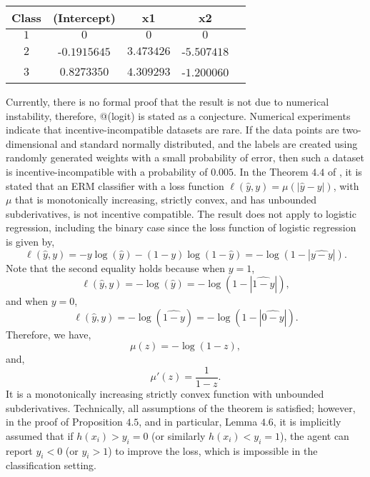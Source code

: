 \documentclass{article}
\begin{document}
\begin{center} \begin{tabular}{|c|c|c|c|c|}
\hline
 Class &(Intercept) &x1 &x2\\ \hline
$1$ &$0$ &$0$ &$0$\\ \hline
$2$ &-$0.1915645$ &$3.473426$ &-$5.507418$\\ \hline
$3$ &$0.8273350$ &$4.309293$ &-$1.200060$\\ \hline
\end{tabular} \end{center}
Currently, there is no formal proof that the result is not due to numerical instability, therefore, @(logit) is stated as a conjecture. Numerical experiments indicate that incentive-incompatible datasets are rare. If the data points are two-dimensional and standard normally distributed, and the labels are created using randomly generated weights with a small probability of error, then such a dataset is incentive-incompatible with a probability of $0.005$.
\newline \newline
In the Theorem $4.4$ of \citet*{dekel2010incentive}, it is stated that an ERM classifier with a loss function $\ell\left(\hat{y}, y\right) = \mu\left(\left| \hat{y} - y \right|\right)$, with $\mu$ that is monotonically increasing, strictly convex, and has unbounded subderivatives, is not incentive compatible. The result does not apply to logistic regression, including the binary case since the loss function of logistic regression is given by,
\begin{equation} 
\ell\left(\hat{y}, y\right) = - y \log\left(\hat{y}\right) - \left(1 - y\right) \log\left(1 - \hat{y}\right) = -\log\left(1-\left| \hat{y-y} \right|\right).
\end{equation}
Note that the second equality holds because when $y  = 1$,
\begin{equation} 
\ell\left(\hat{y}, y\right) = - \log\left(\hat{y}\right) = -\log\left(1-\left| \hat{1-y} \right|\right),
\end{equation}
and when $y  = 0$,
\begin{equation} 
\ell\left(\hat{y}, y\right) = - \log\left(\hat{1-y}\right) = -\log\left(1-\left| \hat{0-y} \right|\right).
\end{equation}
Therefore, we have,
\begin{equation} 
\mu\left(z\right) = -\log\left(1-z\right),
\end{equation}
and,
\begin{equation} 
\mu'\left(z\right) = \dfrac{1}{1-z} .
\end{equation}
It is a monotonically increasing strictly convex function with unbounded subderivatives. Technically, all assumptions of the theorem is satisfied; however, in the proof of Proposition $4.5$, and in particular, Lemma $4.6$, it is implicitly assumed that if $h\left(x_{i}\right)  > y_{i} = 0$ (or similarly $h\left(x_{i}\right)  < y_{i} = 1$), the agent can report $y_{i} < 0$ (or $y_{i} > 1$) to improve the loss, which is impossible in the classification setting.
\newline \newline
\end{document}
